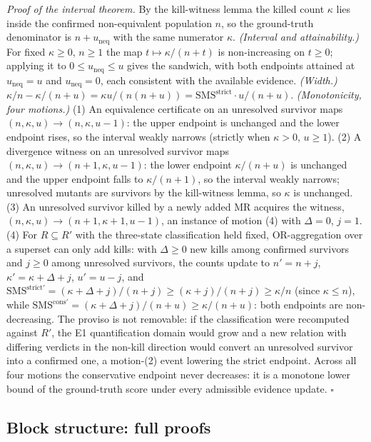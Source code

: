 \documentclass[review,12pt,authoryear]{elsarticle}
\begin{document}
\emph{Proof of the interval theorem.} By the kill-witness lemma the
killed count $\kappa$ lies inside the confirmed non-equivalent
population $n$, so the ground-truth denominator is
$n + u_{\mathrm{neq}}$ with the same numerator $\kappa$.
\emph{(Interval and attainability.)} For fixed $\kappa \geq 0$,
$n \geq 1$ the map $t \mapsto \kappa/(n+t)$ is non-increasing on
$t \geq 0$; applying it to $0 \leq u_{\mathrm{neq}} \leq u$ gives the
sandwich, with both endpoints attained at $u_{\mathrm{neq}} = u$ and
$u_{\mathrm{neq}} = 0$, each consistent with the available evidence.
\emph{(Width.)}
$\kappa/n - \kappa/(n+u) = \kappa u/(n(n+u)) = \mathrm{SMS}^{\mathrm{strict}} \cdot u/(n+u)$.
\emph{(Monotonicity, four motions.)} (1) An equivalence certificate on
an unresolved survivor maps $(n, \kappa, u) \to (n, \kappa, u-1)$: the
upper endpoint is unchanged and the lower endpoint rises, so the
interval weakly narrows (strictly when $\kappa > 0$, $u \geq 1$). (2) A
divergence witness on an unresolved survivor maps
$(n, \kappa, u) \to (n+1, \kappa, u-1)$: the lower endpoint
$\kappa/(n+u)$ is unchanged and the upper endpoint falls to
$\kappa/(n+1)$, so the interval weakly narrows; unresolved mutants are
survivors by the kill-witness lemma, so $\kappa$ is unchanged. (3) An
unresolved survivor killed by a newly added MR acquires the witness,
$(n, \kappa, u) \to (n+1, \kappa+1, u-1)$, an instance of motion (4)
with $\Delta = 0$, $j = 1$. (4) For $R \subseteq R'$ with the
three-state classification held fixed, OR-aggregation over a superset
can only add kills: with $\Delta \geq 0$ new kills among confirmed
survivors and $j \geq 0$ among unresolved survivors, the counts update
to $n' = n + j$, $\kappa' = \kappa + \Delta + j$, $u' = u - j$, and
$\mathrm{SMS}^{\mathrm{strict}\prime} = (\kappa+\Delta+j)/(n+j) \geq (\kappa+j)/(n+j) \geq \kappa/n$
(since $\kappa \leq n$), while
$\mathrm{SMS}^{\mathrm{cons}\prime} = (\kappa+\Delta+j)/(n+u) \geq \kappa/(n+u)$:
both endpoints are non-decreasing. The proviso is not removable: if the
classification were recomputed against $R'$, the E1 quantification
domain would grow and a new relation with differing verdicts in the
non-kill direction would convert an unresolved survivor into a confirmed
one, a motion-(2) event lowering the strict endpoint. Across all four
motions the conservative endpoint never decreases: it is a monotone
lower bound of the ground-truth score under every admissible evidence
update. $\square$

\subsection{Block structure: full proofs}\label{g.7-gap-proofs}
\end{document}
